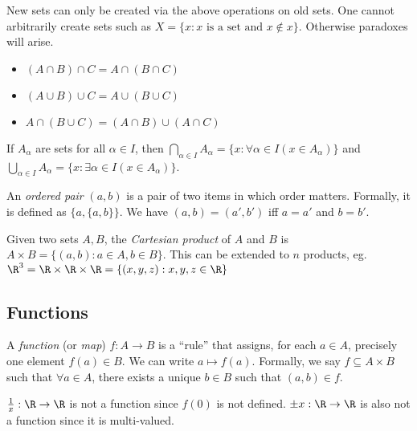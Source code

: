 \documentclass[a4paper]{article}
\begin{document}
  \note New sets can only be created via the above operations on old sets. One cannot arbitrarily create sets such as $X=\{x:x\text{ is a set and }x\not\in x\}$. Otherwise paradoxes will arise.

  \begin{prop}\leavevmode
    \begin{itemize}
      \item $(A\cap B)\cap C = A \cap (B\cap C)$
      \item $(A\cup B)\cup C = A\cup (B\cup C)$
      \item $A\cap(B\cup C) = (A\cap B)\cup (A\cap C)$
    \end{itemize}
  \end{prop}

  \begin{notation}
    If $A_\alpha$ are sets for all $\alpha \in I$, then $\bigcap_{\alpha\in I}A_\alpha = \{x:\forall\alpha\in I(x\in A_\alpha)\}$ and $\bigcup_{\alpha\in I}A_\alpha = \{x:\exists\alpha\in I(x\in A_\alpha)\}$.
  \end{notation}

  \begin{defi}
    An \emph{ordered pair} $(a, b)$ is a pair of two items in which order matters. Formally, it is defined as $\{a, \{a, b\}\}$. We have $(a, b) = (a', b')$ iff $a = a'$ and $b = b'$.
  \end{defi}

  \begin{defi}
    Given two sets $A, B$, the \emph{Cartesian product} of $A$ and $B$ is $A\times B = \{(a, b):a\in A, b\in B\}$. This can be extended to $n$ products, eg. $\R^3 = \R\times\R\times\R = \{(x,y,z): x, y, z\in \R\}$
  \end{defi}

  \subsection{Functions}
  \begin{defi}
    A \emph{function} (or \emph{map}) $f: A\to B$ is a ``rule'' that assigns, for each $a\in A$, precisely one element $f(a)\in B$. We can write $a\mapsto f(a)$. Formally, we say $f\subseteq A\times B$ such that $\forall a\in A$, there exists a unique $b\in B$ such that $(a, b)\in f$.
  \end{defi}

  \begin{eg}
    $\frac{1}{x}:\R\to\R$ is not a function since $f(0)$ is not defined. $\pm x: \R\to\R$ is also not a function since it is multi-valued.
  \end{eg}
\end{document}
